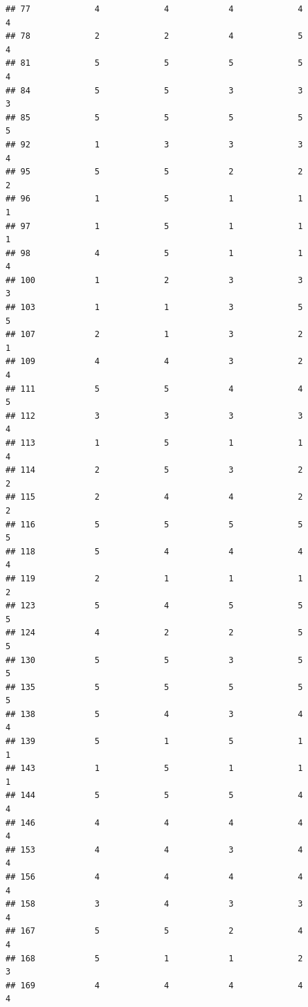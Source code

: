 \documentclass[
]{article}
\begin{document}
\begin{verbatim}
## 77             4             4            4             4          4
## 78             2             2            4             5          4
## 81             5             5            5             5          4
## 84             5             5            3             3          3
## 85             5             5            5             5          5
## 92             1             3            3             3          4
## 95             5             5            2             2          2
## 96             1             5            1             1          1
## 97             1             5            1             1          1
## 98             4             5            1             1          4
## 100            1             2            3             3          3
## 103            1             1            3             5          5
## 107            2             1            3             2          1
## 109            4             4            3             2          4
## 111            5             5            4             4          5
## 112            3             3            3             3          4
## 113            1             5            1             1          4
## 114            2             5            3             2          2
## 115            2             4            4             2          2
## 116            5             5            5             5          5
## 118            5             4            4             4          4
## 119            2             1            1             1          2
## 123            5             4            5             5          5
## 124            4             2            2             5          5
## 130            5             5            3             5          5
## 135            5             5            5             5          5
## 138            5             4            3             4          4
## 139            5             1            5             1          1
## 143            1             5            1             1          1
## 144            5             5            5             4          4
## 146            4             4            4             4          4
## 153            4             4            3             4          4
## 156            4             4            4             4          4
## 158            3             4            3             3          4
## 167            5             5            2             4          4
## 168            5             1            1             2          3
## 169            4             4            4             4          4

\end{verbatim}
\end{document}
